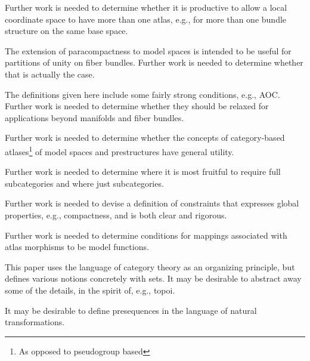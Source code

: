\documentclass{article}
\begin{document}
Further work is needed to determine whether it is productive to
allow a local coordinate space to have more than one atlas, e.g., for
more than one bundle structure on the same base space.

The extension of paracompactness to model spaces is intended to be
useful for partitions of unity on fiber bundles. Further work is
needed to determine whether that is actually the case.

The definitions given here include some fairly strong conditions,
e.g., AOC. Further work is needed to determine whether they should be
relaxed for applications beyond manifolds and fiber bundles.

Further work is needed to determine whether the concepts of
category-based atlases\footnote{As opposed to pseudogroup based}
of model spaces and prestructures have general utility.

Further work is needed to determine where it is most fruitful to require
full subcategories and where just subcategories.

Further work is needed to devise a definition of constraints that
expresses global properties, e.g., compactness, and is both clear and
rigorous.

Further work is needed to determine conditions for mappings associated
with atlas morphisms to be model functions.

This paper uses the language of category theory as an organizing
principle, but defines various notions concretely with sets. It may be
desirable to abstract away some of the details, in the spirit of, e.g.,
topoi.

It may be desirable to define presequences in the language of natural
transformations.



\end{document}
